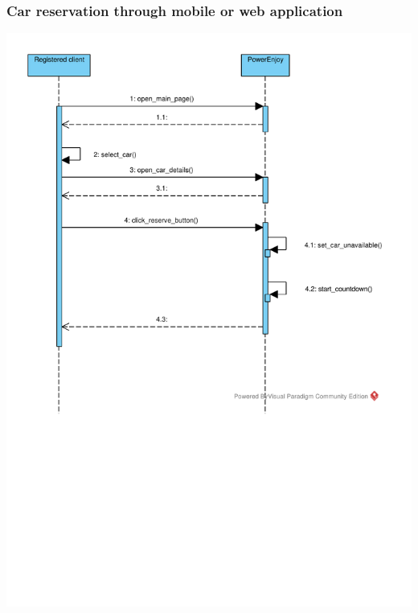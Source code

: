 \subsubsection{Car reservation through mobile or web application}
\includegraphics[width=\textwidth, keepaspectratio]{../images/diagram/sequence/reservation.pdf}


